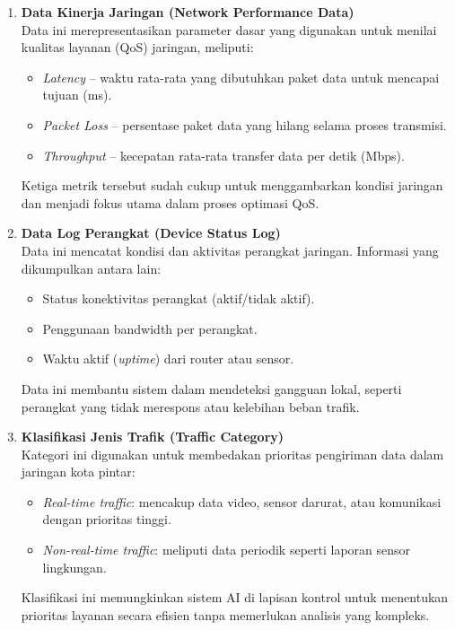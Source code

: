 \documentclass[a4paper,conference]{IEEEtran}
\begin{document}
\begin{enumerate}
    \item \textbf{Data Kinerja Jaringan (Network Performance Data)} \\
    Data ini merepresentasikan parameter dasar yang digunakan untuk menilai kualitas layanan (QoS) jaringan, meliputi:
    \begin{itemize}
        \item \textit{Latency} – waktu rata-rata yang dibutuhkan paket data untuk mencapai tujuan (ms).
        \item \textit{Packet Loss} – persentase paket data yang hilang selama proses transmisi.
        \item \textit{Throughput} – kecepatan rata-rata transfer data per detik (Mbps). 
    \end{itemize}
    Ketiga metrik tersebut sudah cukup untuk menggambarkan kondisi jaringan dan menjadi fokus utama dalam proses optimasi QoS.

    \item \textbf{Data Log Perangkat (Device Status Log)} \\
    Data ini mencatat kondisi dan aktivitas perangkat jaringan. Informasi yang dikumpulkan antara lain:
    \begin{itemize}
        \item Status konektivitas perangkat (aktif/tidak aktif).
        \item Penggunaan bandwidth per perangkat.
        \item Waktu aktif (\textit{uptime}) dari router atau sensor.
    \end{itemize}
    Data ini membantu sistem dalam mendeteksi gangguan lokal, seperti perangkat yang tidak merespons atau kelebihan beban trafik.

    \item \textbf{Klasifikasi Jenis Trafik (Traffic Category)} \\
    Kategori ini digunakan untuk membedakan prioritas pengiriman data dalam jaringan kota pintar:
    \begin{itemize}
        \item \textit{Real-time traffic}: mencakup data video, sensor darurat, atau komunikasi dengan prioritas tinggi.
        \item \textit{Non-real-time traffic}: meliputi data periodik seperti laporan sensor lingkungan.
    \end{itemize}
    Klasifikasi ini memungkinkan sistem AI di lapisan kontrol untuk menentukan prioritas layanan secara efisien tanpa memerlukan analisis yang kompleks.
\end{enumerate}
\end{document}
